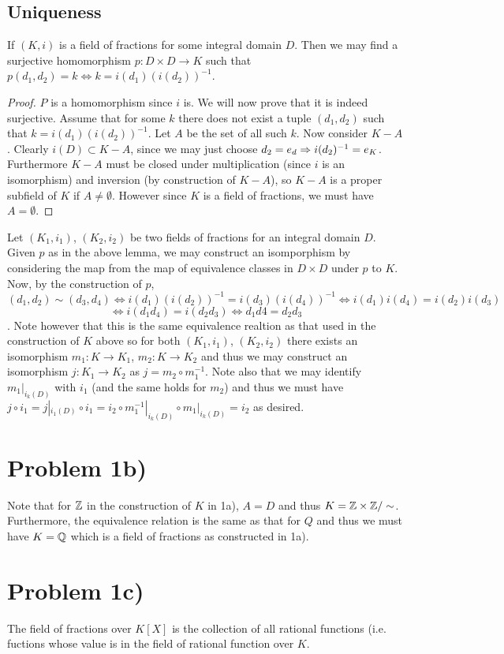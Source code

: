 \subsection*{Uniqueness}
\begin{lemma}
If $(K,i)$ is a field of fractions for some integral domain $D$. Then we may find a surjective homomorphism $p: D\times D \to K$ such that $p(d_1,d_2)=k \iff k=i(d_1)(i(d_2))^{-1}$. 
\begin{proof}
$P$ is a homomorphism since $i$ is. We will now prove that it is indeed surjective.
Assume that for some $k$ there does not exist a tuple $(d_1,d_2)$ such that $k=i(d_1)(i(d_2))^{-1}$. Let $A$ be the set of all such $k$. Now consider $K-A$. Clearly $i(D)\subset K-A$, since we may just choose $d_2=e_d\Rightarrow i(d_2)^{-1}=e_K$. Furthermore $K-A$ must be closed under multiplication (since $i$ is an isomorphism) and inversion (by construction of $K-A$), so $K-A$ is a proper subfield of $K$ if $A\neq \emptyset$. However since $K$ is a field of fractions, we must have $A=\emptyset$.
\end{proof}
\end{lemma}
Let $(K_1,i_1)$, $(K_2,i_2)$ be two fields of fractions for an integral domain $D$. Given $p$ as in the above lemma, we may construct an isomporphism by considering the map from the map of equivalence classes in $D\times D$ under $p$ to $K$. Now, by the construction of $p$,
\[ (d_1,d_2)\sim (d_3,d_4) \iff i(d_1)(i(d_2))^{-1}=i(d_3)(i(d_4))^{-1} \iff  i(d_1)i(d_4) = i(d_2)i(d_3) \]\[ \iff i(d_1d_4) = i(d_2d_3) \iff d_1d4=d_2d_3 \]. Note however that this is the same equivalence realtion as that used in the construction of $K$ above so for both $(K_1,i_1)$, $(K_2,i_2)$ there exists an isomorphism $m_1: K\to K_1$, $m_2: K \to K_2$ and thus we may construct an isomorphism $j: K_1\to K_2$ as $j=m_2\circ m_1^{-1}$. Note also that we may identify $m_1|_{i_k(D)}$ with $i_1$ (and the same holds for $m_2$) and thus we must have $j\circ i_1 = j|_{i_1(D)} \circ i_1 = i_2 \circ m_1^{-1}|_{i_k(D)} \circ m_1|_{i_k(D)} = i_2$ as desired.
\section*{Problem 1b)}
Note that for $\mathbb{Z}$ in the construction of $K$ in 1a), $A=D$ and thus $K=\mathbb{Z}\times \mathbb{Z}/\sim$. Furthermore, the equivalence relation is the same as that for $Q$ and thus we must have $K=\mathbb{Q}$ which is a field of fractions as constructed in 1a).
\section*{Problem 1c)}
The field of fractions over $K[X]$ is the collection of all rational functions (i.e. fuctions whose value is in the field of rational function over $K$. 
